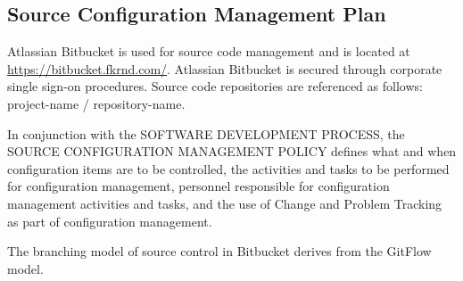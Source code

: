 \subsection{Source Configuration Management Plan}

Atlassian Bitbucket is used for source code management and is located at
\url{https://bitbucket.fkrnd.com/}. Atlassian Bitbucket is secured
through corporate single sign-on procedures. Source code repositories are
referenced as follows: project-name / repository-name.

In conjunction with the SOFTWARE DEVELOPMENT PROCESS, the SOURCE CONFIGURATION
MANAGEMENT POLICY defines what and when configuration items are to be
controlled, the activities and tasks to be performed for configuration
management, personnel responsible for configuration management activities and
tasks, and the use of Change and Problem Tracking as part of configuration
management.

\tlcVspace

The branching model of source control in Bitbucket derives from the GitFlow
model.
